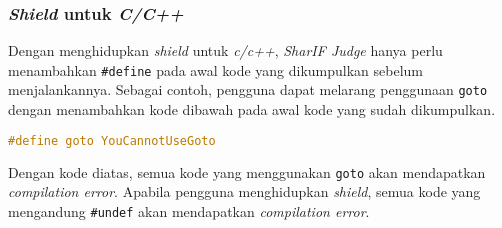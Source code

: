\subsubsection{\textit{Shield} untuk \textit{C/C++}}
Dengan menghidupkan \textit{shield} untuk \textit{c/c++}, \textit{SharIF Judge} hanya perlu menambahkan \verb|#define| pada awal kode yang dikumpulkan sebelum menjalankannya. Sebagai contoh, pengguna dapat melarang penggunaan \verb|goto| dengan menambahkan kode dibawah pada awal kode yang sudah dikumpulkan.
\begin{lstlisting}[language=C,caption=Kode \textit{shield} untuk melarang penggunaan goto, label=kode:goto]
#define goto YouCannotUseGoto
\end{lstlisting}
Dengan kode diatas, semua kode yang menggunakan \verb|goto| akan mendapatkan \textit{compilation error}. Apabila pengguna menghidupkan \textit{shield}, semua kode yang mengandung \verb|#undef| akan mendapatkan \textit{compilation error}.

